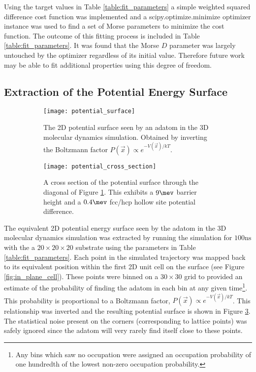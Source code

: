 Using the target values in Table \ref{table:fit_parameters} a simple weighted squared difference cost function was implemented and a scipy.optimize.minimize \cite{2020SciPy-NMeth} optimizer instance was used to find a set of Morse parameters to minimize the cost function. The outcome of this fitting process is included in Table \ref{table:fit_parameters}. It was found that the Morse $D$ parameter was largely untouched by the optimizer regardless of its initial value. Therefore future work may be able to fit additional properties using this degree of freedom.

\subsection{Extraction of the Potential Energy Surface} \label{sec:extract_potential}


\begin{figure}
	\centering
	\begin{subfigure}[t]{0.48\textwidth}
		\texttt{[image: potential\_surface]}
		\caption{The 2D potential surface seen by an adatom in the 3D molecular dynamics simulation. Obtained by inverting the Boltzmann factor $P(\vec{x}) \propto e^{-V(\vec{x})/kT}$.}
		\label{fig:potential_surface_plot}
	\end{subfigure}
	\hfill
	\begin{subfigure}[t]{0.48\textwidth}
		\texttt{[image: potential\_cross\_section]}
		\caption{A cross section of the potential surface through the diagonal of Figure \ref{fig:potential_surface_plot}. This exhibits a $9\mev$ barrier height and a $0.4\mev$ fcc/hcp hollow site potential difference.}
		\label{fig:potential_cross_section}
	\end{subfigure}
	\caption{}
	\label{fig:potential_surface}
\end{figure}

The equivalent 2D potential energy surface seen by the adatom in the 3D molecular dynamics simulation was extracted by running the simulation for $100\si{\nano\second}$ with the a $20\times20\times20$ substrate using the parameters in Table \ref{table:fit_parameters}. Each point in the simulated trajectory was mapped back to its equivalent position within the first 2D unit cell on the surface (see Figure \ref{fig:in_plane_cell}). These points were binned on a $30\times30$ grid to provided an estimate of the probability of finding the adatom in each bin at any given time\footnote{Any bins which saw no occupation were assigned an occupation probability of one hundredth of the lowest non-zero occupation probability.}. This probability is proportional to a Boltzmann factor, $P\left(\vec{x}\right) \propto e^{-V\left(\vec{x}\right)/kT}$. This relationship was inverted and the resulting potential surface is shown in Figure \ref{fig:potential_surface}. The statistical noise present on the corners (corresponding to lattice points) was safely ignored since the adatom will very rarely find itself close to these points.

